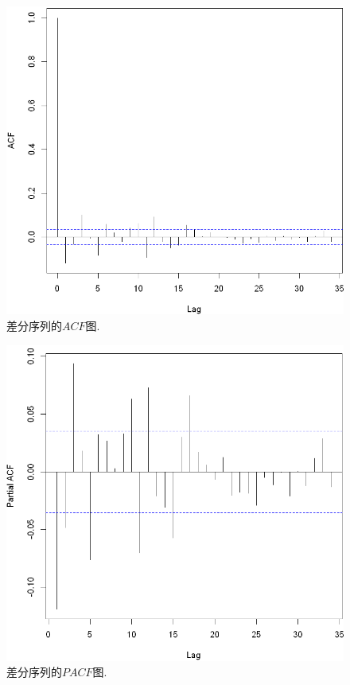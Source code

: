 \documentclass[11pt]{article}
\begin{document}
\begin{center}
    \hspace{30pt}\begin{minipage}{0.45\textwidth}
        \begin{figure}
            \centering
            \hspace{-30pt}\includegraphics[width=.9\textwidth]{output_8_0}
            \caption{差分序列的$ACF$图.\label{fig:3}}
        \end{figure}
    \end{minipage}
    \begin{minipage}{0.45\textwidth}
        \begin{figure}
            \centering
            \hspace{-25pt}\includegraphics[width=.9\textwidth]{output_9_0}
            \caption{差分序列的$PACF$图.\label{fig:4}}
        \end{figure}
    \end{minipage}
\end{center}
\end{document}

